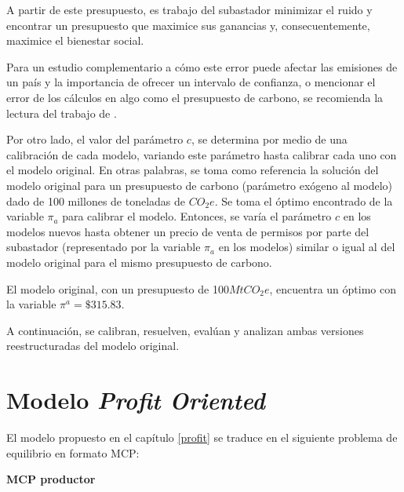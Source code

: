 A partir de este presupuesto, es trabajo del subastador minimizar el ruido y encontrar un presupuesto que maximice sus ganancias y, consecuentemente, maximice el bienestar social.
\vspace{2.5mm}

Para un estudio complementario a cómo este error puede afectar las emisiones de un país y la importancia de ofrecer un intervalo de confianza, o mencionar el error de los cálculos en algo como el presupuesto de carbono, se recomienda la lectura del trabajo de  .
\vspace{2.5mm}

Por otro lado, el valor del parámetro $c$, se determina por medio de una calibración de cada modelo, variando este parámetro hasta calibrar cada uno con el modelo original. En otras palabras, se toma como referencia la solución del modelo original para un presupuesto de carbono (parámetro exógeno al modelo)  dado de 100 millones de toneladas de $CO_{2}e$. Se toma el óptimo encontrado de la variable $\pi_a$ para calibrar el modelo. Entonces, se varía el parámetro $c$ en los modelos nuevos hasta obtener un precio de venta de permisos por parte del subastador (representado por la variable $\pi_a$ en los modelos) similar o igual al del modelo original para el mismo presupuesto de carbono.
\vspace{2.5mm}

El modelo original, con un presupuesto de 100$MtCO_{2}e$, encuentra un óptimo con la variable $\pi^a= \$315.83$.
\vspace{2.5mm}

A continuación, se calibran, resuelven, evalúan y analizan ambas versiones reestructuradas del modelo original.

\section{Modelo \textit{Profit Oriented}} \label{resultadosprofit}

El modelo propuesto en el capítulo \ref{profit} se traduce en el siguiente problema de equilibrio en formato MCP: 

\textbf{MCP productor}

